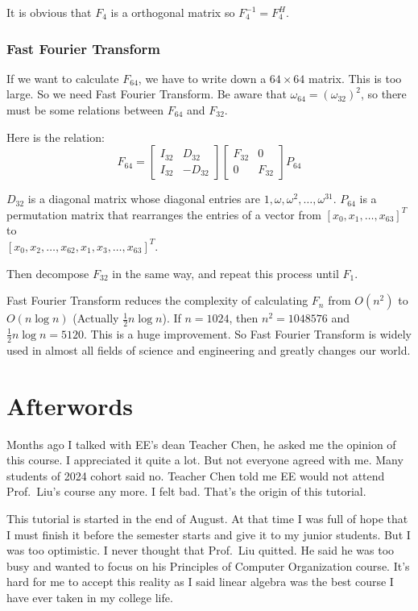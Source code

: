 \documentclass[12pt]{ctexart}
\begin{document}
It is obvious that $F_4$ is a orthogonal matrix so $F_4^{-1} = F_4^{H}$.

\subsubsection{\textbf{Fast Fourier Transform}}

If we want to calculate $F_{64}$, we have to write down a $64 \times 64$ matrix. This is
too large. So we need Fast Fourier Transform. Be aware that $\omega_{64} = (\omega_{32})^2$,
so there must be some relations between $F_{64}$ and $F_{32}$.

Here is the relation:
\[
  F_{64} = \begin{bmatrix}
    I_{32} & D_{32} \\
    I_{32} & -D_{32}
  \end{bmatrix}
  \begin{bmatrix}
    F_{32} & 0 \\
    0 & F_{32}
  \end{bmatrix}
  P_{64}
\]

$D_{32}$ is a diagonal matrix whose diagonal entries are $1, \omega, \omega^2,
\ldots, \omega^{31}$. $P_{64}$ is a permutation matrix that rearranges the entries of
a vector from $[x_0, x_1, \ldots, x_{63}]^T$ to \\
$[x_0, x_2, \ldots, x_{62}, x_1, x_3, \ldots, x_{63}]^T$.

Then decompose $F_{32}$ in the same way, and repeat this process until $F_1$.

Fast Fourier Transform reduces the complexity of calculating $F_n$ from $O(n^2)$ to
$O(n \log n)$ (Actually $\frac12 n \log n$). If $n = 1024$, then $n^2 = 1048576$ and
$\frac12 n \log n = 5120$. This is a huge improvement. So Fast Fourier Transform is widely
used in almost all fields of science and engineering and greatly changes our world.

\newpage
\section{\textbf{Afterwords}}

Months ago I talked with EE's dean Teacher Chen, he asked me the opinion of
this course. I appreciated it quite a lot. But not everyone agreed with me. Many students
of 2024 cohort said no. Teacher Chen told me EE would not attend Prof.\ Liu's course any more.
I felt bad. That's the origin of this tutorial.

This tutorial is started in the end of August. At that time I was full of hope that I must
finish it before the semester starts and give it to my junior students. But I was too
optimistic. I never thought that Prof.\ Liu quitted. He said he was too busy and wanted to
focus on his Principles of Computer Organization course. It's hard for me to accept this
reality as I said linear algebra was the best course I have ever taken in my college life.
\end{document}
